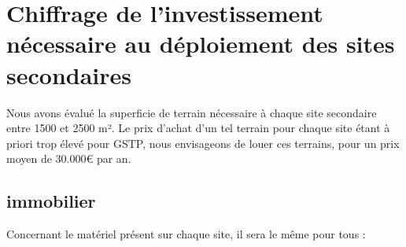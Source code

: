 \section{Chiffrage de l'investissement nécessaire au déploiement des sites secondaires}

Nous avons évalué la superficie de terrain nécessaire à chaque site secondaire entre 1500 et 2500 m². Le prix d'achat d'un tel terrain pour chaque site étant à priori trop élevé pour GSTP, nous envisageons de louer ces terrains, pour un prix moyen de 30.000€ par an.

\subsection{immobilier}

Concernant le matériel présent sur chaque site, il sera le même pour tous : 
